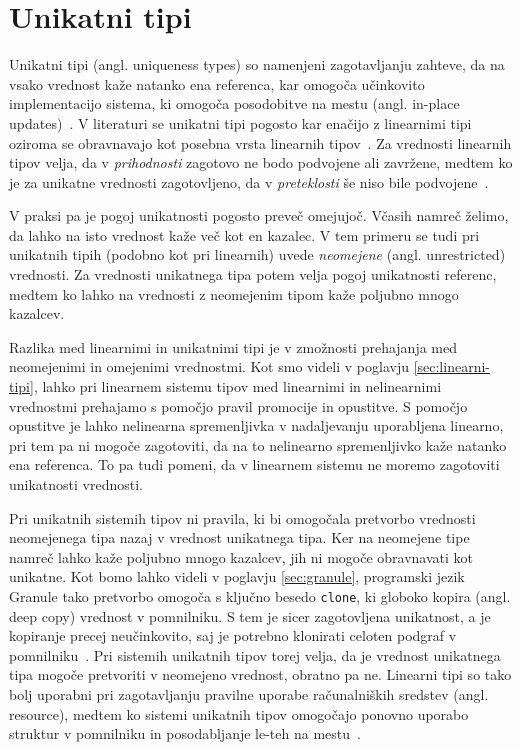 \section{Unikatni tipi}
\label{sec:unikatni-tipi}

Unikatni tipi (angl. uniqueness types) so namenjeni zagotavljanju zahteve, da na vsako vrednost kaže natanko ena referenca, kar omogoča učinkovito implementacijo sistema, ki omogoča posodobitve na mestu (angl. in-place updates)~\cite{marshall2022linearity}. V literaturi se unikatni tipi pogosto kar enačijo z linearnimi tipi oziroma se obravnavajo kot posebna vrsta linearnih tipov~\cite{pierce2004advanced, bernardy2018linear}. Za vrednosti linearnih tipov velja, da v \textit{prihodnosti} zagotovo ne bodo podvojene ali zavržene, medtem ko je za unikatne vrednosti zagotovljeno, da v \textit{preteklosti} še niso bile podvojene~\cite{marshall2022linearity, marshall2024functional}.

V praksi pa je pogoj unikatnosti pogosto preveč omejujoč. Včasih namreč želimo, da lahko na isto vrednost kaže več kot en kazalec. V tem primeru se tudi pri unikatnih tipih (podobno kot pri linearnih) uvede \emph{neomejene} (angl. unrestricted) vrednosti. Za vrednosti unikatnega tipa potem velja pogoj unikatnosti referenc, medtem ko lahko na vrednosti z neomejenim tipom kaže poljubno mnogo kazalcev.

Razlika med linearnimi in unikatnimi tipi je v zmožnosti prehajanja med neomejenimi in omejenimi vrednostmi. Kot smo videli v poglavju \ref{sec:linearni-tipi}, lahko pri linearnem sistemu tipov med linearnimi in nelinearnimi vrednostmi prehajamo s pomočjo pravil promocije in opustitve. S pomočjo opustitve je lahko nelinearna spremenljivka v nadaljevanju uporabljena linearno, pri tem pa ni mogoče zagotoviti, da na to nelinearno spremenljivko kaže natanko ena referenca. To pa tudi pomeni, da v linearnem sistemu ne moremo zagotoviti unikatnosti vrednosti.

Pri unikatnih sistemih tipov ni pravila, ki bi omogočala pretvorbo vrednosti neomejenega tipa nazaj v vrednost unikatnega tipa. Ker na neomejene tipe namreč lahko kaže poljubno mnogo kazalcev, jih ni mogoče obravnavati kot unikatne. Kot bomo lahko videli v poglavju \ref{sec:granule}, programski jezik Granule tako pretvorbo omogoča s ključno besedo \texttt{clone}, ki globoko kopira (angl. deep copy) vrednost v pomnilniku. S tem je sicer zagotovljena unikatnost, a je kopiranje precej neučinkovito, saj je potrebno klonirati celoten podgraf v pomnilniku~\cite{marshall2024functional}. Pri sistemih unikatnih tipov torej velja, da je vrednost unikatnega tipa mogoče pretvoriti v neomejeno vrednost, obratno pa ne. Linearni tipi so tako bolj uporabni pri zagotavljanju pravilne uporabe računalniških sredstev (angl. resource), medtem ko sistemi unikatnih tipov omogočajo ponovno uporabo struktur v pomnilniku in posodabljanje le-teh na mestu~\cite{marshall2022linearity}.

